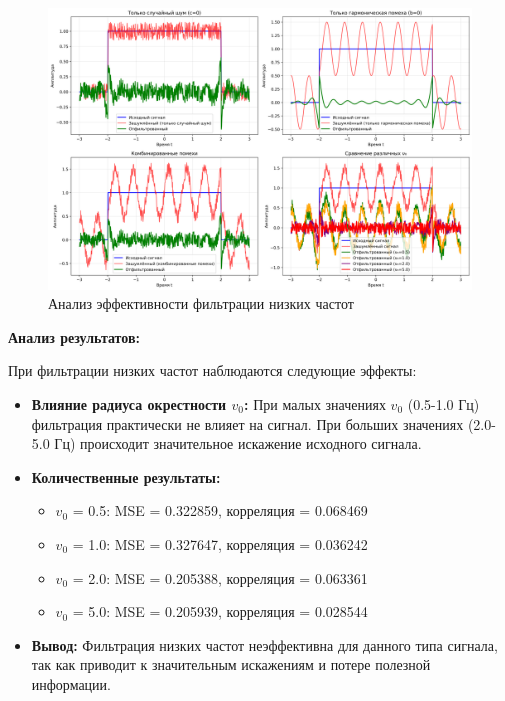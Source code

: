 \begin{figure}[H]
\centering
\includegraphics[width=\textwidth]{images/task1/low_freq_filter_analysis.png}
\caption{Анализ эффективности фильтрации низких частот}
\end{figure}

\textbf{Анализ результатов:}

При фильтрации низких частот наблюдаются следующие эффекты:

\begin{itemize}
    \item \textbf{Влияние радиуса окрестности $v_0$:} При малых значениях $v_0$ (0.5-1.0 Гц) фильтрация практически не влияет на сигнал. При больших значениях (2.0-5.0 Гц) происходит значительное искажение исходного сигнала.
    
    \item \textbf{Количественные результаты:}
    \begin{itemize}
        \item $v_0$ = 0.5: MSE = 0.322859, корреляция = 0.068469
        \item $v_0$ = 1.0: MSE = 0.327647, корреляция = 0.036242
        \item $v_0$ = 2.0: MSE = 0.205388, корреляция = 0.063361
        \item $v_0$ = 5.0: MSE = 0.205939, корреляция = 0.028544
    \end{itemize}
    
    \item \textbf{Вывод:} Фильтрация низких частот неэффективна для данного типа сигнала, так как приводит к значительным искажениям и потере полезной информации.
\end{itemize}

